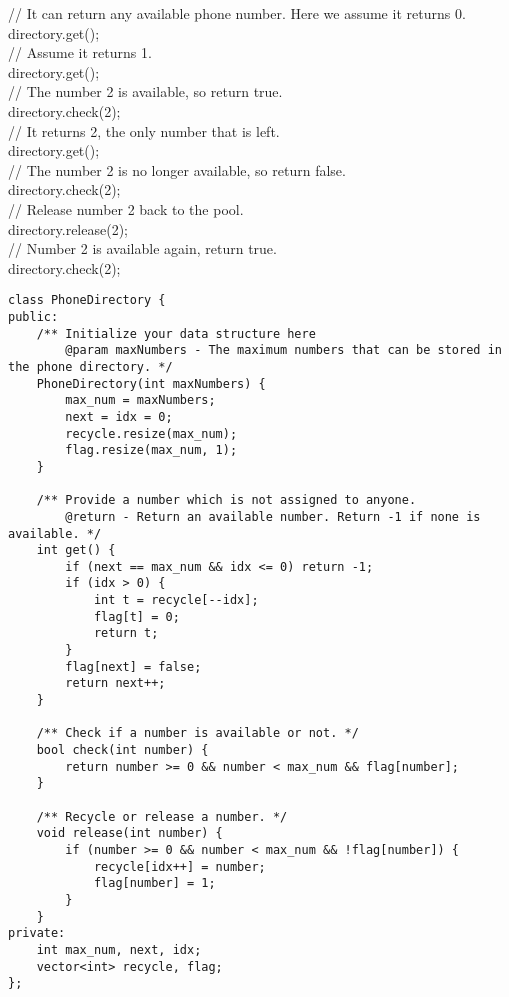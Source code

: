 // It can return any available phone number. Here we assume it returns 0.\\
directory.get();\\

// Assume it returns 1.\\
directory.get();\\

// The number 2 is available, so return true.\\
directory.check(2);\\

// It returns 2, the only number that is left.\\
directory.get();\\

// The number 2 is no longer available, so return false.\\
directory.check(2);\\

// Release number 2 back to the pool.\\
directory.release(2);\\

// Number 2 is available again, return true.\\
directory.check(2);\\

\begin{lstlisting}
class PhoneDirectory {
public:
    /** Initialize your data structure here
        @param maxNumbers - The maximum numbers that can be stored in the phone directory. */
    PhoneDirectory(int maxNumbers) {
        max_num = maxNumbers;
        next = idx = 0;
        recycle.resize(max_num);
        flag.resize(max_num, 1);
    }
    
    /** Provide a number which is not assigned to anyone.
        @return - Return an available number. Return -1 if none is available. */
    int get() {
        if (next == max_num && idx <= 0) return -1;
        if (idx > 0) {
            int t = recycle[--idx];
            flag[t] = 0;
            return t;
        }
        flag[next] = false;
        return next++;
    }
    
    /** Check if a number is available or not. */
    bool check(int number) {
        return number >= 0 && number < max_num && flag[number];
    }
    
    /** Recycle or release a number. */
    void release(int number) {
        if (number >= 0 && number < max_num && !flag[number]) {
            recycle[idx++] = number;
            flag[number] = 1;
        }
    }
private:
    int max_num, next, idx;
    vector<int> recycle, flag;
};
\end{lstlisting}


